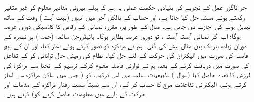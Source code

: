  حر ناگزر عمل کے تجزیے کی بنیادی حکمت عملی یہ ہے کہ پہلے بیرونی مقادیر معلوم کو غیر متغیر رکھتے ہوئے مسئلہ حل کیا جاتا ہے، اور حساب کے بالکل آخر میں انہیں (بہت آہستہ) وقت کے ساتھ تبدیل ہونے کی اجازت دی جاتی ہے۔ مثال کے طور پر، مقررہ لمبائی  کے رقاص کا کلاسیکی دوری عرصہ  ہوگا؛ اب اگر لمبائی آہستہ آہستہ ، تو دوری عرصہ بظاہر  ہوگا۔ ہائیڈروجن سالمہ (حصہ ) پر تبصرہ کے دوران زیادہ باریک بین مثال پیش کی گئی۔ ہم نے مراکزہ کو  تصور کرتے ہوئے آغاز کیا، اور ان کے بیچ فاصلہ  کی صورت میں الیکٹران کی حرکت کے لئے حل کیا۔ نظام کی زمینی حال توانائی کو  کے تفاعل کی صورت میں دریافت کرنے کے بعد، ہم نے توازنی فاصلہ معلوم کرکے ترسیم کے انحنا سے مراکزہ کی لرزش کا تعدد حاصل کیا (سوال )۔طبیعیات سالمہ میں اس ترکیب کو ( جس میں ساکن مراکزہ سے آغاز کرتے ہوئے، الیکٹرانی تفاعلات موج کا حساب کر کے، ان سے نسبتاً سست رفتار مراکزہ کے مقامات اور حرکت کے بارے میں معلومات حاصل کرنے کو)  کہتے ہیں۔
 
